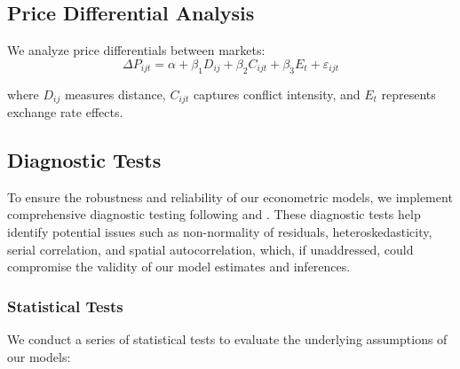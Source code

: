 \subsection{Price Differential Analysis}
We analyze price differentials between markets:
\vspace{-0.5em}
\begin{equation}
\Delta P_{ijt} = \alpha + \beta_1 D_{ij} + \beta_2 C_{ijt} + \beta_3 E_t + \varepsilon_{ijt}
\end{equation}
\vspace{-0.5em}

where $D_{ij}$ measures distance, $C_{ijt}$ captures conflict intensity, and $E_t$ represents exchange rate effects.

\subsection{Diagnostic Tests}
To ensure the robustness and reliability of our econometric models, we implement comprehensive diagnostic testing following \citet{jarque1987test} and \citet{breusch1979simple}. These diagnostic tests help identify potential issues such as non-normality of residuals, heteroskedasticity, serial correlation, and spatial autocorrelation, which, if unaddressed, could compromise the validity of our model estimates and inferences.

\subsubsection{Statistical Tests}
We conduct a series of statistical tests to evaluate the underlying assumptions of our models:

